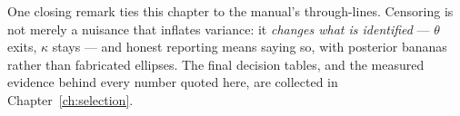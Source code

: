 One closing remark ties this chapter to the manual's through-lines. Censoring is not
merely a nuisance that inflates variance: it \emph{changes what is identified} ---
$\theta$ exits, $\kappa$ stays --- and honest reporting means saying so, with posterior
bananas rather than fabricated ellipses. The final decision tables, and the measured
evidence behind every number quoted here, are collected in Chapter~\ref{ch:selection}.
